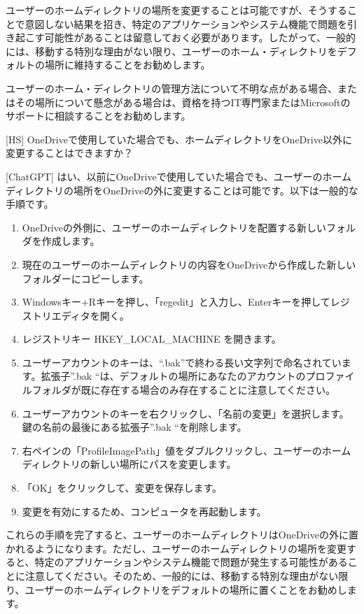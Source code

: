 \documentclass[
]{book}
\theoremstyle{definition}
\theoremstyle{definition}
\theoremstyle{definition}
\theoremstyle{definition}
\theoremstyle{remark}
\begin{document}
ユーザーのホームディレクトリの場所を変更することは可能ですが、そうすることで意図しない結果を招き、特定のアプリケーションやシステム機能で問題を引き起こす可能性があることは留意しておく必要があります。したがって、一般的には、移動する特別な理由がない限り、ユーザーのホーム・ディレクトリをデフォルトの場所に維持することをお勧めします。

ユーザーのホーム・ディレクトリの管理方法について不明な点がある場合、またはその場所について懸念がある場合は、資格を持つIT専門家またはMicrosoftのサポートに相談することをお勧めします。

{[}HS{]} OneDriveで使用していた場合でも、ホームディレクトリをOneDrive以外に変更することはできますか？

{[}ChatGPT{]} はい、以前にOneDriveで使用していた場合でも、ユーザーのホームディレクトリの場所をOneDriveの外に変更することは可能です。以下は一般的な手順です。

\begin{enumerate}
\def\labelenumi{\arabic{enumi}.}
\item
  OneDriveの外側に、ユーザーのホームディレクトリを配置する新しいフォルダを作成します。
\item
  現在のユーザーのホームディレクトリの内容をOneDriveから作成した新しいフォルダーにコピーします。
\item
  Windowsキー+Rキーを押し、「regedit」と入力し、Enterキーを押してレジストリエディタを開く。
\item
  レジストリキー HKEY\_LOCAL\_MACHINE を開きます。
\item
  ユーザーアカウントのキーは、``.bak''で終わる長い文字列で命名されています。拡張子''.bak ``は、デフォルトの場所にあなたのアカウントのプロファイルフォルダが既に存在する場合のみ存在することに注意してください。
\item
  ユーザーアカウントのキーを右クリックし、「名前の変更」を選択します。鍵の名前の最後にある拡張子''.bak ``を削除します。
\item
  右ペインの「ProfileImagePath」値をダブルクリックし、ユーザーのホームディレクトリの新しい場所にパスを変更します。
\item
  「OK」をクリックして、変更を保存します。
\item
  変更を有効にするため、コンピュータを再起動します。
\end{enumerate}

これらの手順を完了すると、ユーザーのホームディレクトリはOneDriveの外に置かれるようになります。ただし、ユーザーのホームディレクトリの場所を変更すると、特定のアプリケーションやシステム機能で問題が発生する可能性があることに注意してください。そのため、一般的には、移動する特別な理由がない限り、ユーザーのホームディレクトリをデフォルトの場所に置くことをお勧めします。
\end{document}
